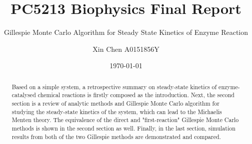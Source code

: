 \documentclass[a4paper, 10pt]{scrartcl}
\title{PC5213 Biophysics Final Report}
\subtitle{Gillespie Monte Carlo Algorithm for Steady State Kinetics of Enzyme Reaction}
\author[*]{Xin Chen A0151856Y}
\date{\today}
\begin{document}
  \maketitle 
  \begin{abstract}
  Based on a simple system, a retrospective summary on steady-state kinetics of enzyme-catalysed chemical reactions is firstly composed as the introduction. Next, the second section is a review of analytic methods and Gillespie Monte Carlo algorithm for studying the steady-state kinetics of the system, which can lead to the Michaelis Menten theory. The equivalence of the direct and "first-reaction" Gillespie Monte Carlo methods is shown in the second section as well. Finally, in the last section, simulation results from both of the two Gillespie methods are demonstrated and compared.

  \end{abstract}

  
  
\end{document}
